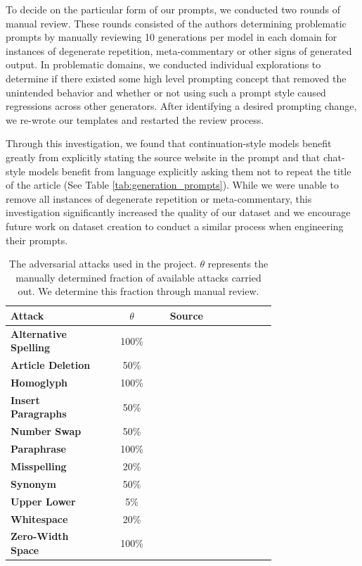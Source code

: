 \documentclass[11pt]{article}
\begin{document}
To decide on the particular form of our prompts, we conducted two rounds of manual review. These rounds consisted of the authors determining problematic prompts by manually reviewing 10 generations per model in each domain for instances of degenerate repetition, meta-commentary or other signs of generated output. In problematic domains, we conducted individual explorations to determine if there existed some high level prompting concept that removed the unintended behavior and whether or not using such a prompt style caused regressions across other generators. After identifying a desired prompting change, we re-wrote our templates and restarted the review process.

Through this investigation, we found that continuation-style models benefit greatly from explicitly stating the source website in the prompt and that chat-style models benefit from language explicitly asking them not to repeat the title of the article (See Table \ref{tab:generation_prompts}). While we were unable to remove all instances of degenerate repetition or meta-commentary, this investigation significantly increased the quality of our dataset and we encourage future work on dataset creation to conduct a similar process when engineering their prompts.

\begin{table}[t]
\centering 
\small
\begin{tabular}{p{0.35\linewidth}|c|p{0.4\linewidth}} 
\toprule
\textbf{Attack}&\textbf{$\theta$}&\textbf{Source}\\
\midrule
\textbf{Alternative Spelling}&100\%&\cite{liang2023gpt}\\
\textbf{Article Deletion}&50\%&\cite{liang2023mutationbased,guerrero2022mutationbased}\\
\textbf{Homoglyph}&100\%&\cite{wolff2020attacking,gagiano-etal-2021-robustness}\\
\textbf{Insert Paragraphs}&50\%&\cite{bhat-parthasarathy-2020-effectively}\\
\textbf{Number Swap}&50\%&\cite{bhat-parthasarathy-2020-effectively}\\
\textbf{Paraphrase}&100\%&\cite{krishna2023paraphrasing,sadasivan2023aigenerated}\\
\textbf{Misspelling}&20\%&\cite{liang2023mutationbased,gagiano-etal-2021-robustness,gao2018blackbox}\\
\textbf{Synonym}&50\%&\cite{pu-etal-2023-deepfake}\\
\textbf{Upper Lower}&5\%&\cite{gagiano-etal-2021-robustness}\\
\textbf{Whitespace}&20\%&\cite{cai2023evade,gagiano-etal-2021-robustness}\\
\textbf{Zero-Width Space}&100\%&\cite{guerrero2022mutationbased}\\
\bottomrule
\end{tabular}
\caption{The adversarial attacks used in the project. $\theta$ represents the manually determined fraction of available attacks carried out. We determine this fraction through manual review.}
\label{tab:adversarial}
\end{table}
\end{document}
